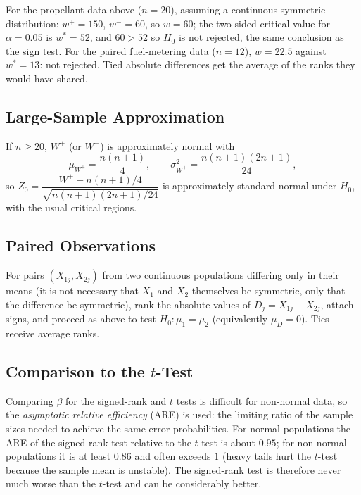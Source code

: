 \begin{example}
For the propellant data above ($n=20$), assuming a continuous symmetric distribution: $w^+=150$, $w^-=60$, so $w=60$; the two-sided critical value for $\alpha=0.05$ is $w^*=52$, and $60>52$ so $H_0$ is not rejected, the same conclusion as the sign test. For the paired fuel-metering data ($n=12$), $w=22.5$ against $w^*=13$: not rejected. Tied absolute differences get the average of the ranks they would have shared.
\end{example}

\subsection{Large-Sample Approximation}

If $n\ge20$, $W^+$ (or $W^-$) is approximately normal with
\[ \mu_{W^+}=\frac{n(n+1)}4,\qquad\sigma^2_{W^+}=\frac{n(n+1)(2n+1)}{24}, \]
so $Z_0=\dfrac{W^+-n(n+1)/4}{\sqrt{n(n+1)(2n+1)/24}}$ is approximately standard normal under $H_0$, with the usual critical regions.

\subsection{Paired Observations}

For pairs $(X_{1j},X_{2j})$ from two continuous populations differing only in their means (it is not necessary that $X_1$ and $X_2$ themselves be symmetric, only that the difference be symmetric), rank the absolute values of $D_j=X_{1j}-X_{2j}$, attach signs, and proceed as above to test $H_0:\mu_1=\mu_2$ (equivalently $\mu_D=0$). Ties receive average ranks.

\subsection{Comparison to the $t$-Test}

Comparing $\beta$ for the signed-rank and $t$ tests is difficult for non-normal data, so the \emph{asymptotic relative efficiency} (ARE) is used: the limiting ratio of the sample sizes needed to achieve the same error probabilities. For normal populations the ARE of the signed-rank test relative to the $t$-test is about $0.95$; for non-normal populations it is at least $0.86$ and often exceeds $1$ (heavy tails hurt the $t$-test because the sample mean is unstable). The signed-rank test is therefore never much worse than the $t$-test and can be considerably better.

